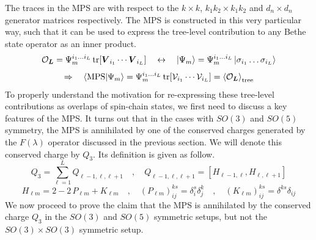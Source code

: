 \newpage
The traces in the MPS are with respect to the $k \times k$, $k_1 k_2 \times k_1 k_2$ and $d_n \times d_n$ generator matrices respectively. The MPS is constructed in this very particular way, such that it can be used to express the tree-level contribution to any Bethe state operator as an inner product.
%
%
\begin{equation}
\mathcal{O}_{\boldsymbol{L}} = \Psi_m^{i_1 \ldots i_L} \tr [\boldsymbol{V}_{i_1} \cdots \boldsymbol{V}_{i_L}]
\quad \leftrightarrow \quad
\ket{\Psi_m} = \Psi_m^{i_1 \ldots i_L} \ket{\sigma_{i_1} \ldots \sigma_{i_L}}
\end{equation}
%
%
\begin{equation}
\Rightarrow \quad
%
\braket{\text{MPS}}{\Psi_m} = \Psi_m^{i_1 \ldots i_L} \tr [\mathcal{V}_{i_1} \cdots \mathcal{V}_{i_L}] = \expval{\mathcal{O}_{\boldsymbol{L}}}_{\text{tree}}
\end{equation}
%
%
To properly understand the motivation for re-expressing these tree-level contributions as overlaps of spin-chain states, we first need to discuss a key features of the MPS. It turns out that in the cases with $SO(3)$ and $SO(5)$ symmetry, the MPS is annihilated by one of the conserved charges generated by the $F(\lambda)$ operator discussed in the previous section. We will denote this conserved charge by $Q_3$. Its definition is given as follow.
%
%
\begin{equation}\label{The third charge}
Q_3 = \sum_{\ell=1}^L Q_{\ell-1,\ell,\ell+1}
%
\quad , \quad
%
Q_{\ell-1,\ell,\ell+1} = [H_{\ell-1,\ell}, H_{\ell, \ell+1}]
\end{equation}
%
%
\begin{equation}\label{The spin-chain Hamiltonian}
H_{\ell m} = 2 - 2\, P_{\ell m} + K_{\ell m}
%
\quad , \quad
%
(P_{\ell m})_{ij}^{ks} = \delta^s_i \delta^k_j
%
\quad , \quad
%
(K_{\ell m})_{ij}^{ks} = \delta^{ks} \delta_{ij}
\end{equation}
%
%
We now proceed to prove the claim that the MPS is annihilated by the conserved charge $Q_3$ in the $SO(3)$ and $SO(5)$ symmetric setups, but not the $SO(3) \times SO(3)$ symmetric setup.

